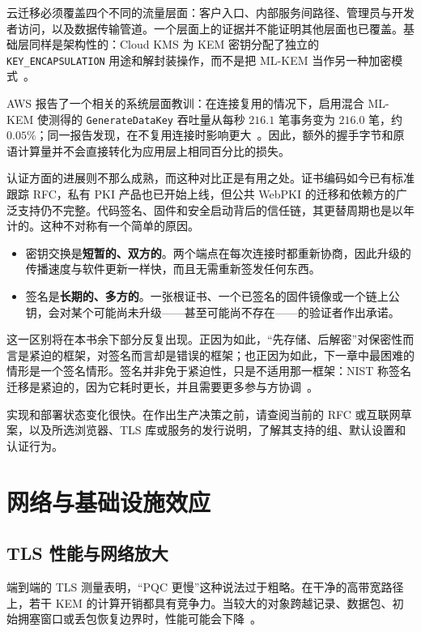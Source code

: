 云迁移必须覆盖四个不同的流量层面：客户入口、内部服务间路径、管理员与开发者访问，以及数据传输管道。一个层面上的证据并不能证明其他层面也已覆盖。基础层同样是架构性的：Cloud KMS 为 KEM 密钥分配了独立的 \texttt{KEY\_ENCAPSULATION} 用途和解封装操作，而不是把 ML-KEM 当作另一种加密模式~\cite{googlecloudkmsalgorithms2026}。

AWS 报告了一个相关的系统层面教训：在连接复用的情况下，启用混合 ML-KEM 使测得的 \texttt{GenerateDataKey} 吞吐量从每秒 $216.1$ 笔事务变为 $216.0$ 笔，约 $0.05\%$；同一报告发现，在不复用连接时影响更大~\cite{awspqtls2025}。因此，额外的握手字节和原语计算量并不会直接转化为应用层上相同百分比的损失。

认证方面的进展则不那么成熟，而这种对比正是有用之处。证书编码如今已有标准跟踪 RFC，私有 PKI 产品也已开始上线，但公共 WebPKI 的迁移和依赖方的广泛支持仍不完整。代码签名、固件和安全启动背后的信任链，其更替周期也是以年计的。这种不对称有一个简单的原因。

\begin{itemize}
  \item 密钥交换是\textbf{短暂的、双方的}。两个端点在每次连接时都重新协商，因此升级的传播速度与软件更新一样快，而且无需重新签发任何东西。
  \item 签名是\textbf{长期的、多方的}。一张根证书、一个已签名的固件镜像或一个链上公钥，会对某个可能尚未升级——甚至可能尚不存在——的验证者作出承诺。
\end{itemize}

这一区别将在本书余下部分反复出现。正因为如此，“先存储、后解密”对保密性而言是紧迫的框架，对签名而言却是错误的框架；也正因为如此，下一章中最困难的情形是一个签名情形。签名并非免于紧迫性，只是不适用那一框架：NIST 称签名迁移是紧迫的，因为它耗时更长，并且需要更多参与方协调~\cite{nistir8547}。

实现和部署状态变化很快。在作出生产决策之前，请查阅当前的 RFC 或互联网草案，以及所选浏览器、TLS 库或服务的发行说明，了解其支持的组、默认设置和认证行为。

\section{网络与基础设施效应}

\subsection{TLS 性能与网络放大}

端到端的 TLS 测量表明，“PQC 更慢”这种说法过于粗略。在干净的高带宽路径上，若干 KEM 的计算开销都具有竞争力。当较大的对象跨越记录、数据包、初始拥塞窗口或丢包恢复边界时，性能可能会下降~\cite{pqtlsperformance2023,pqtlspqcrypto2020}。

